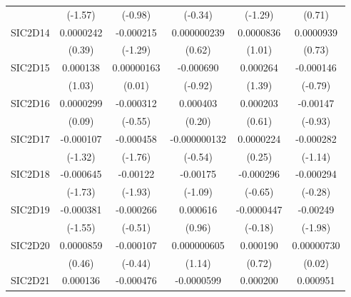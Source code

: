 \begin{table}[htbp]
\begin{tabular}{l*{5}{c}}
            &     (-1.57)         &     (-0.98)         &     (-0.34)         &     (-1.29)         &      (0.71)         \\
SIC2D14     &   0.0000242         &   -0.000215         & 0.000000239         &   0.0000836         &   0.0000939         \\
            &      (0.39)         &     (-1.29)         &      (0.62)         &      (1.01)         &      (0.73)         \\
SIC2D15     &    0.000138         &  0.00000163         &   -0.000690         &    0.000264         &   -0.000146         \\
            &      (1.03)         &      (0.01)         &     (-0.92)         &      (1.39)         &     (-0.79)         \\
SIC2D16     &   0.0000299         &   -0.000312         &    0.000403         &    0.000203         &    -0.00147         \\
            &      (0.09)         &     (-0.55)         &      (0.20)         &      (0.61)         &     (-0.93)         \\
SIC2D17     &   -0.000107         &   -0.000458         &-0.000000132         &   0.0000224         &   -0.000282         \\
            &     (-1.32)         &     (-1.76)         &     (-0.54)         &      (0.25)         &     (-1.14)         \\
SIC2D18     &   -0.000645         &    -0.00122         &    -0.00175         &   -0.000296         &   -0.000294         \\
            &     (-1.73)         &     (-1.93)         &     (-1.09)         &     (-0.65)         &     (-0.28)         \\
SIC2D19     &   -0.000381         &   -0.000266         &    0.000616         &  -0.0000447         &    -0.00249\sym{*}  \\
            &     (-1.55)         &     (-0.51)         &      (0.96)         &     (-0.18)         &     (-1.98)         \\
SIC2D20     &   0.0000859         &   -0.000107         & 0.000000605         &    0.000190         &  0.00000730         \\
            &      (0.46)         &     (-0.44)         &      (1.14)         &      (0.72)         &      (0.02)         \\
SIC2D21     &    0.000136         &   -0.000476         &  -0.0000599         &    0.000200         &    0.000951         \\

\end{tabular}
\end{table}
